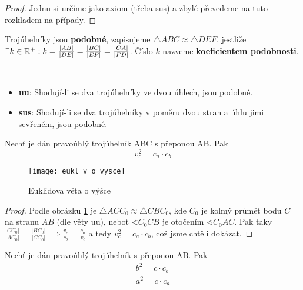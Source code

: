 \begin{proof}
  Jednu si určíme jako axiom (třeba sus) a zbylé převedeme na tuto rozkladem na případy.
\end{proof}

\begin{definition}
  Trojúhelníky jsou \textbf{podobné}, zapisujeme $\triangle ABC \approx \triangle DEF$, jestliže $\exists k \in \mathbb{R}^+:k = \frac{|AB|}{|DE|}=\frac{|BC|}{|EF|}=\frac{|CA|}{|FD|}$. Číslo $k$ nazveme \textbf{koeficientem podobnosti}.
\end{definition}

\begin{veta}
  \,
  \begin{itemize}
    \item \textbf{uu}: Shodují-li se dva trojúhelníky ve dvou úhlech, jsou podobné.
    \item \textbf{sus}: Shodují-li se dva trojúhelníky v poměru dvou stran a úhlu jimi sevřeném, jsou podobné.
  \end{itemize}
\end{veta}

\begin{veta}
  Nechť je dán pravoúhlý trojúhelník ABC s přeponou AB. Pak
  $$v_c^2 = c_a \cdot c_b$$
  \begin{figure}[ht!]
    \centering
    \texttt{[image: eukl\_v\_o\_vysce]}
    \caption{Euklidova věta o výšce}
    \label{eukl_v_o_v}
  \end{figure}
\end{veta}

\begin{proof}
  Podle obrázku \ref{eukl_v_o_v} je $\triangle ACC_0 \approx \triangle CBC_0$, kde $C_0$ je kolmý průmět bodu $C$ na stranu $AB$ (dle věty uu), neboť $\sphericalangle C_0 CB$ je otočením $\sphericalangle C_0 AC$. Pak taky $\frac{|CC_0|}{|AC_0|} = \frac{|BC_0|}{|CC_0|} \implies \frac{v_c}{c_b} = \frac{c_a}{v_c}$ a tedy $v_c^2 = c_a \cdot c_b$, což jsme chtěli dokázat.
\end{proof}

\begin{veta}
  Nechť je dán pravoúhlý trojúhelník s přeponou AB. Pak
  \begin{align*}
    b^2 = c \cdot c_b\\
    a^2 = c \cdot c_a
  \end{align*}
\end{veta}

